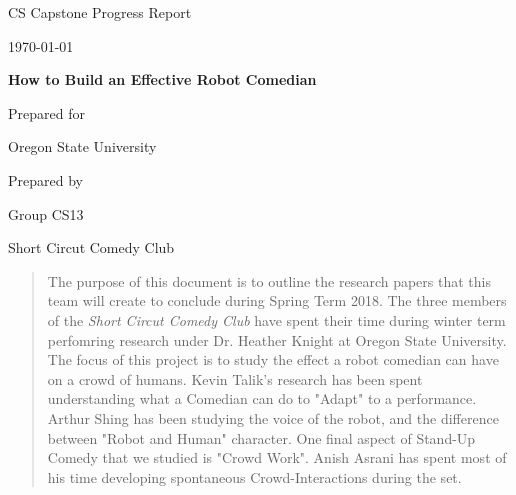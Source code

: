 \documentclass[onecolumn, draftclsnofoot,10pt, compsoc]{IEEEtran}
\def \CapstoneTeamName{	Short Circut Comedy Club	}
\def \CapstoneTeamNumber{		CS13}
\def \CapstoneProjectName{		How to Build an Effective Robot Comedian}
\def \CapstoneSponsorCompany{	Oregon State University}
\def \DocType{		%
				Progress Report
				}
\begin{document}
\begin{titlepage}
    \begin{singlespace}
        \hfill 
        \par\vspace{.2in}
        \centering
        \scshape{
            \huge CS Capstone \DocType \par
            {\large\today}\par
            \vspace{.5in}
            \textbf{\Huge\CapstoneProjectName}\par
            \vfill
            {\large Prepared for}\par
            \Huge \CapstoneSponsorCompany\par
            \vspace{5pt}
            {\large Prepared by }\par
            Group\CapstoneTeamNumber\par
            \CapstoneTeamName\par 
            \vspace{5pt}
            \vspace{20pt}
        }
        \begin{abstract}
			The purpose of this document is to outline the research papers that this team will create to conclude during Spring Term 2018. 
			The three members of the \textit{Short Circut Comedy Club} have spent their time during winter term perfomring research under Dr. Heather Knight at Oregon State University.
			The focus of this project is to study the effect a robot comedian can have on a crowd of humans.
			Kevin Talik's research has been spent understanding what a Comedian can do to "Adapt" to a performance. 
			Arthur Shing has been studying the voice of the robot, and the difference between "Robot and Human" character.
			One final aspect of Stand-Up Comedy that we studied is "Crowd Work". Anish Asrani has spent most of his time developing spontaneous Crowd-Interactions during the set.
        \end{abstract}     
    \end{singlespace}
\end{titlepage}
\newpage
{}
\tableofcontents
\clearpage
\end{document}
